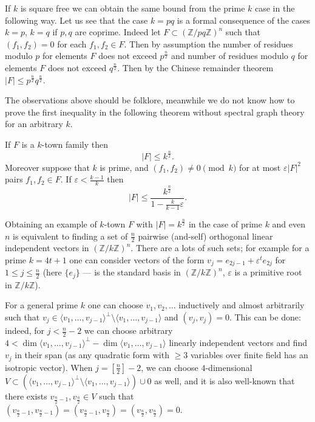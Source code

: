 \documentclass[8pt]{article}
\begin{document}
If $k$ is square free we can obtain the same bound from the prime $k$ case in the following way. Let us see that the case $k=pq$ is a formal consequence of the cases $k=p$, $k=q$ if $p,q$ are coprime. Indeed let $F\subset (\mathbb{Z}/pq\mathbb{Z})^n$ such that $(f_1,f_2) = 0$ for each $f_1,f_2 \in F$.  Then by assumption the number of residues modulo $p$ for elements $F$ does not exceed $p^{\frac{n}{2}}$ and number of residues modulo $q$ for elements $F$ does not exceed $q^{\frac{n}{2}}$. Then by the Chinese remainder theorem  $|F|\leq p^{\frac{n}{2}}q^{\frac{n}{2}}$.


The observations above should be folklore, meanwhile we do not know how to prove the first inequality in the following theorem without spectral graph theory for an arbitrary $k$. 
\begin{theorem}
If $F$ is a $k$-town family then 
\[
|F|\leq k^{\frac{n}{2}}.
\]
Moreover suppose that $k$ is prime, and $(f_1,f_2) \neq 0 \pmod k$ for at most $\varepsilon|F|^2$ pairs $f_1,f_2 \in F$.
If $\varepsilon < \frac{k-1}{k}$ then
\[
|F| \leq \frac{k^{\frac{n}{2}}} {1 - \frac{k}{k-1} \varepsilon}.
\]
\label{ktown}
\end{theorem}


Obtaining an example of $k$-town $F$ with $|F| = k^{\frac{n}{2}}$ in the case of prime $k$ and even $n$ is equivalent to finding a set of $\frac{n}{2}$ pairwise (and-self) orthogonal linear independent vectors in $(\mathbb{Z}/k\mathbb{Z})^n$. There are a lots of such sets; for example for a prime $k=4t+1$ one can consider vectors of the form $v_j=e_{2j-1}+\varepsilon^t e_{2j}$ for $1\leq j\leq \frac{n}{2}$ (here $\{e_j\}$ --- is the standard basis in $(\mathbb{Z}/k\mathbb{Z})^n$, $\varepsilon$ is a primitive root in $\mathbb{Z}/k\mathbb{Z}$). 

For a general prime $k$ one can choose $v_1,v_2,\dots$ inductively and almost arbitrarily such that $v_j\in \langle v_1,\dots,v_{j-1}\rangle^{\perp}\setminus \langle v_1,\dots,v_{j-1}\rangle$  and $(v_j,v_j)=0$. This can be done: indeed, for $j<\frac{n}{2}-2$ we can choose arbitrary $4<\dim \langle v_1,\dots,v_{j-1}\rangle^{\perp} - \dim \langle v_1,\dots,v_{j-1}\rangle$ linearly independent vectors and find $v_j$ in their span (as any quadratic form with $\geq 3$ variables over finite field has an isotropic vector). When $j=[\frac{n}{2}]-2$, we can choose $4$-dimensional 
$V\subset (\langle v_1,\dots,v_{j-1}\rangle^{\perp}\setminus \langle v_1,\dots,v_{j-1}\rangle)\cup{0}$ as well, 
and it is also well-known that there exists $v_{\frac{n}{2}-1}, v_{\frac{n}{2}}\in V$ such that $(v_{\frac{n}{2}-1},v_{\frac{n}{2}-1})=(v_{\frac{n}{2}-1},v_{\frac{n}{2}})=
(v_{\frac{n}{2}},v_{\frac{n}{2}}) = 0$.
\end{document}
